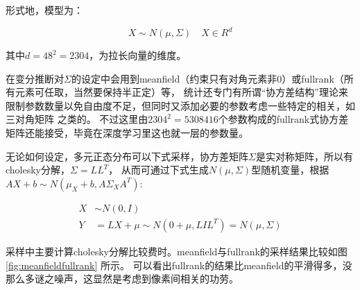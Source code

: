 \documentclass[twocolumn,11pt]{ctexart}
\begin{document}
形式地，模型为：

$$
X \sim N(\mu, \Sigma) \quad X \in R^d
$$

其中$d=48^2=2304$，为拉长向量的维度。

在变分推断对$\Sigma$的设定中会用到meanfield（约束只有对角元素非0）或fullrank（所有元素可任取，当然要保持半正定）等，
统计还专门有所谓“协方差结构”理论来限制参数数量以免自由度不足，但同时又添加必要的参数考虑一些特定的相关，如三对角矩阵
之类的。
不过这里由$2304^2 = 5308416$个参数构成的fullrank式协方差矩阵还能接受，毕竟在深度学习里这也就一层的参数量。

无论如何设定，多元正态分布可以下式采样，协方差矩阵$\Sigma$是实对称矩阵，所以有cholesky分解，$\Sigma = LL^T$，
从而可通过下式生成$N(\mu,\Sigma)$型随机变量，根据$AX+b \sim N(\mu_X + b, A\Sigma_XA^T)$:

\begin{align*}
    X &\sim N(0, I) \\
    Y &= L X + \mu \sim N(0+\mu,LIL^T) = N(\mu, \Sigma)
\end{align*}

采样中主要计算cholesky分解比较费时。meanfield与fullrank的采样结果比较如图 \ref{fig:meanfieldfullrank} 所示。
可以看出fullrank的结果比meanfield的平滑得多，没那么多谜之噪声，这显然是考虑到像素间相关的功劳。
\end{document}
